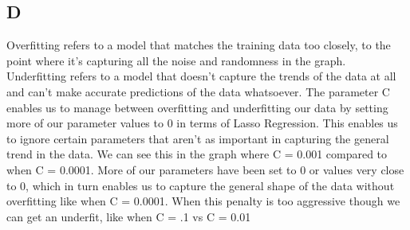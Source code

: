 \documentclass[11pt]{article} %
\begin{document}
 \subsection{D}
 Overfitting refers to a model that matches the training data too closely, to the point where it's capturing all the noise and randomness in the graph. Underfitting refers to a model that doesn't capture the trends of the data at all and can't make accurate predictions of the data whatsoever. The parameter C enables us to manage between overfitting and underfitting our data by setting more of our parameter values to 0 in terms of Lasso Regression. This enables us to ignore certain parameters that aren't as important in capturing the general trend in the data. We can see this in the graph where C = 0.001 compared to when C = 0.0001. More of our parameters have been set to 0 or values very close to 0, which in turn enables us to capture the general shape of the data without overfitting like when C = 0.0001. When this penalty is too aggressive though we can get an underfit, like when C = .1 vs C = 0.01
 \newpage
\end{document}
